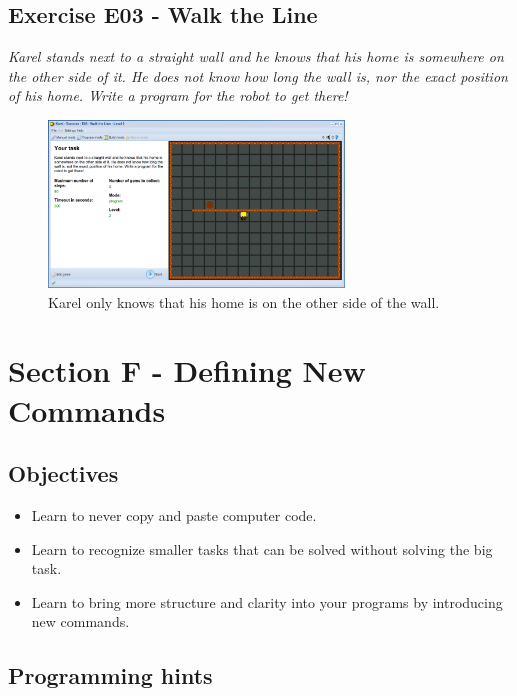 \documentclass[article,A4,12pt]{llncs}
\begin{document}
{{{{\subsection{Exercise E03 - Walk the Line}

{\em Karel stands next to a straight wall and he knows that his home is somewhere on the other side of it. He does not know how long the wall is, nor the exact position of his home. Write a program for the robot to get there!}

\begin{figure}[!ht]
\begin{center}
\includegraphics[width=0.7\textwidth]{img/e03.png}
\end{center}
\vspace{-4mm}
\caption{Karel only knows that his home is on the other side of the wall.}
\label{fig:e03}
\end{figure}
\noindent


\section{Section F - Defining New Commands}

\subsection{Objectives} 
 
\begin{itemize}
\item Learn to never copy and paste computer code.
\item Learn to recognize smaller tasks that can be solved without solving the big task.
\item Learn to bring more structure and clarity into your programs by introducing new commands.
\end{itemize}

\subsection{Programming hints}

}}}}
\end{document}
